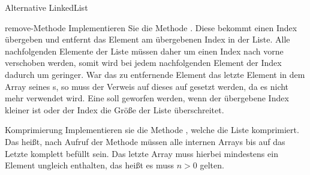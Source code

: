 \documentclass{../tuda-exercise}
\begin{document}
\begin{task}{Alternative LinkedList}
    \clearpagesolution

    \begin{subtask*}[credit=\stars{2}{3}]{remove-Methode}
      Implementieren Sie die Methode . Diese bekommt einen Index
       übergeben und entfernt das Element am übergebenen Index in der Liste. Alle
      nachfolgenden Elemente der Liste müssen daher um einen Index nach vorne verschoben werden,
      somit wird bei jedem nachfolgenden Element der Index dadurch um  geringer.
      War das zu entfernende Element das letzte Element in dem Array seines
      s, so muss der Verweis auf dieses  auf
       gesetzt werden, da es nicht mehr verwendet wird. Eine
       soll geworfen werden, wenn der übergebene Index
      kleiner  ist oder der Index die Größe der Liste überschreitet.

      \begin{solution}
        
      \end{solution}
    \end{subtask*}

    \clearpagesolution

    \begin{subtask*}[credit=\stars{3}{3}]{Komprimierung}
      Implementieren sie die Methode , welche die Liste komprimiert.
      Das heißt, nach Aufruf der Methode müssen alle internen Arrays bis auf das Letzte komplett
      befüllt sein. Das letzte Array muss hierbei mindestens ein Element ungleich
       enthalten, das heißt es muss \(n > 0\) gelten.

      \begin{figure}[h]
        \centering
\end{figure}
\end{subtask*}
\end{task}
\end{document}
